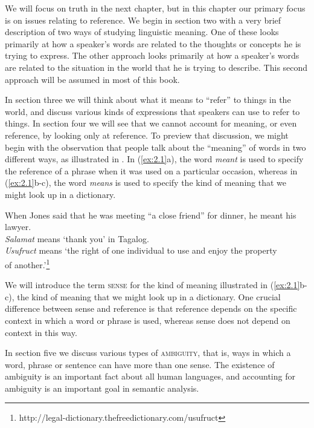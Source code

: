 We will focus on truth in the next chapter, but in this chapter our primary focus is on issues relating to reference. We begin in section two with a very brief description of two ways of studying linguistic meaning. One of these looks primarily at how a speaker’s words are related to the thoughts or concepts he is trying to express. The other approach looks primarily at how a speaker’s words are related to the situation in the world that he is trying to describe. This second approach will be assumed in most of this book.



In section three we will think about what it means to “refer” to things in the world, and discuss various kinds of expressions that speakers can use to refer to things. In section four we will see that we cannot account for meaning, or even reference, by looking only at reference. To preview that discussion, we might begin with the observation that people talk about the “meaning” of words in two different ways, as illustrated in . In (\ref{ex:2.1}a), the word \textit{meant} is used to specify the reference of a phrase when it was used on a particular occasion, whereas in (\ref{ex:2.1}b-c), the word \textit{means} is used to specify the kind of meaning that we might look up in a dictionary.


\ea \label{ex:2.1}
\ea When Jones said that he was meeting “a close friend” for dinner, he meant his lawyer.\\
\ex \textit{Salamat} means ‘thank you’ in Tagalog.\\
\ex \textit{Usufruct} means ‘the right of one individual to use and enjoy the property\\
  of another.’\footnote{http://legal-dictionary.thefreedictionary.com/usufruct}
\z
\z


We will introduce the term \textsc{sense} for the kind of meaning illustrated in (\ref{ex:2.1}b-c), the kind of meaning that we might look up in a dictionary. One crucial difference between sense and reference is that reference depends on the specific context in which a word or phrase is used, whereas sense does not depend on context in this way.



In section five we discuss various types of \textsc{ambiguity}, that is, ways in which a word, phrase or sentence can have more than one sense. The existence of ambiguity is an important fact about all human languages, and accounting for ambiguity is an important goal in semantic analysis.



